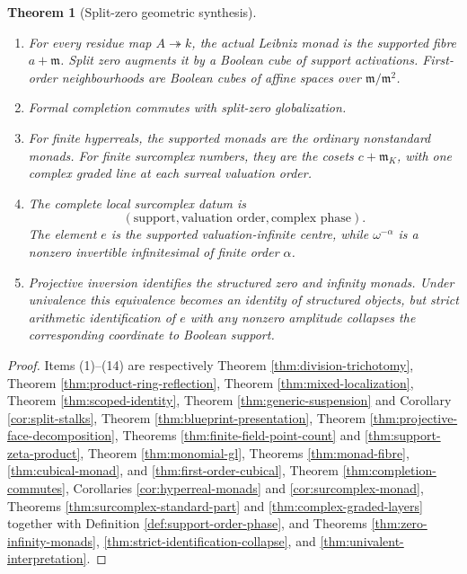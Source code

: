 \documentclass[11pt]{amsart}
\numberwithin{equation}{section}
\newtheorem{theorem}{Theorem}[section]
\theoremstyle{definition}
\begin{document}
\begin{theorem}[Split-zero geometric synthesis]
\begin{enumerate}[label=\textup{(\arabic*)},leftmargin=3.2em]
\item For every residue map $A\twoheadrightarrow k$, the actual Leibniz monad is the supported fibre $a+\mathfrak m$.  Split zero augments it by a Boolean cube of support activations.  First-order neighbourhoods are Boolean cubes of affine spaces over $\mathfrak m/\mathfrak m^2$.

\item Formal completion commutes with split-zero globalization.

\item For finite hyperreals, the supported monads are the ordinary nonstandard monads.  For finite surcomplex numbers, they are the cosets $c+\mathfrak m_K$, with one complex graded line at each surreal valuation order.

\item The complete local surcomplex datum is
\[
(\text{support},\text{valuation order},\text{complex phase}).
\]
The element $e$ is the supported valuation-infinite centre, while $\omega^{-\alpha}$ is a nonzero invertible infinitesimal of finite order $\alpha$.

\item Projective inversion identifies the structured zero and infinity monads.  Under univalence this equivalence becomes an identity of structured objects, but strict arithmetic identification of $e$ with any nonzero amplitude collapses the corresponding coordinate to Boolean support.
\end{enumerate}
\end{theorem}

\begin{proof}
Items (1)--(14) are respectively Theorem \ref{thm:division-trichotomy}, Theorem \ref{thm:product-ring-reflection}, Theorem \ref{thm:mixed-localization}, Theorem \ref{thm:scoped-identity}, Theorem \ref{thm:generic-suspension} and Corollary \ref{cor:split-stalks}, Theorem \ref{thm:blueprint-presentation}, Theorem \ref{thm:projective-face-decomposition}, Theorems \ref{thm:finite-field-point-count} and \ref{thm:support-zeta-product}, Theorem \ref{thm:monomial-gl}, Theorems \ref{thm:monad-fibre}, \ref{thm:cubical-monad}, and \ref{thm:first-order-cubical}, Theorem \ref{thm:completion-commutes}, Corollaries \ref{cor:hyperreal-monads} and \ref{cor:surcomplex-monad}, Theorems \ref{thm:surcomplex-standard-part} and \ref{thm:complex-graded-layers} together with Definition \ref{def:support-order-phase}, and Theorems \ref{thm:zero-infinity-monads}, \ref{thm:strict-identification-collapse}, and \ref{thm:univalent-interpretation}.
\end{proof}
\end{document}
